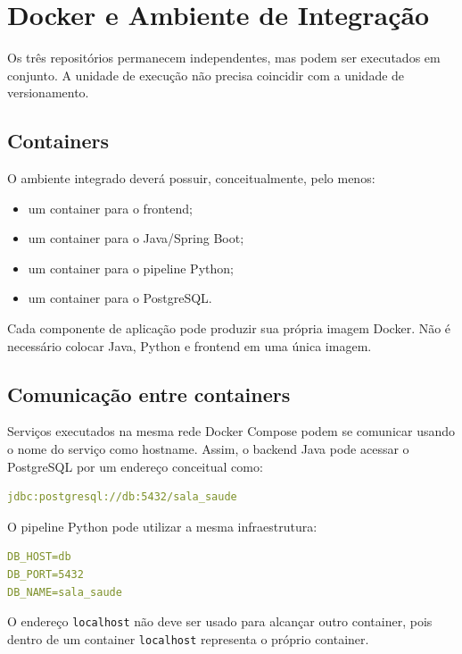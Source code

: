 \section{Docker e Ambiente de Integração}

Os três repositórios permanecem independentes, mas podem ser executados em conjunto. A unidade de execução não precisa coincidir com a unidade de versionamento.

\subsection{Containers}

O ambiente integrado deverá possuir, conceitualmente, pelo menos:

\begin{itemize}
    \item um container para o frontend;
    \item um container para o Java/Spring Boot;
    \item um container para o pipeline Python;
    \item um container para o PostgreSQL.
\end{itemize}

Cada componente de aplicação pode produzir sua própria imagem Docker. Não é necessário colocar Java, Python e frontend em uma única imagem.


\subsection{Comunicação entre containers}

Serviços executados na mesma rede Docker Compose podem se comunicar usando o nome do serviço como hostname. Assim, o backend Java pode acessar o PostgreSQL por um endereço conceitual como:

\begin{lstlisting}[language=YAML]
jdbc:postgresql://db:5432/sala_saude
\end{lstlisting}

O pipeline Python pode utilizar a mesma infraestrutura:

\begin{lstlisting}[language=YAML]
DB_HOST=db
DB_PORT=5432
DB_NAME=sala_saude
\end{lstlisting}

O endereço \texttt{localhost} não deve ser usado para alcançar outro container, pois dentro de um container \texttt{localhost} representa o próprio container.

